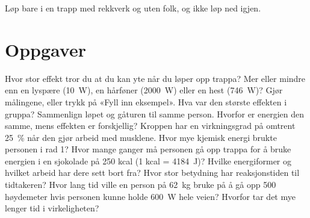 \documentclass[11pt]{article}
\begin{document}
Løp bare i en trapp med rekkverk og uten folk, og ikke løp ned igjen.

\section*{Oppgaver}

\begin{oppgaveliste}
\oppgave {}Hvor stor effekt tror du at du kan yte når du løper opp trappa? Mer eller mindre enn en lyspære (10~W), en hårføner (2000~W) eller en hest (746~W)?
\svar
\oppgave {}Gjør målingene, eller trykk på «Fyll inn eksempel». Hva var den største effekten i gruppa?
\svar
\oppgave {}Sammenlign løpet og gåturen til samme person. Hvorfor er energien den samme, mens effekten er forskjellig?
\svar
\oppgave {}Kroppen har en virkningsgrad på omtrent 25~\% når den gjør arbeid med musklene. Hvor mye kjemisk energi brukte personen i rad 1? Hvor mange ganger må personen gå opp trappa for å bruke energien i en sjokolade på 250 kcal (1 kcal = 4184~J)?
\svar
\oppgave {}Hvilke energiformer og hvilket arbeid har dere sett bort fra? Hvor stor betydning har reaksjonstiden til tidtakeren?
\svar
\oppgave {}Hvor lang tid ville en person på 62~kg bruke på å gå opp 500 høydemeter hvis personen kunne holde 600~W hele veien? Hvorfor tar det mye lenger tid i virkeligheten?
\svar
\end{oppgaveliste}
\end{document}
